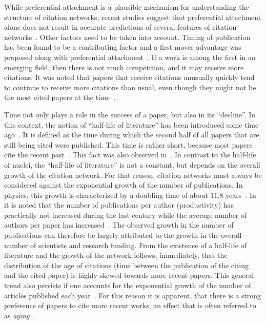 \documentclass[fleqn,10pt]{wlscirep}
\begin{document}
While preferential attachment is a plausible mechanism for understanding the structure of citation networks, recent studies suggest that preferential attachment alone does not result in accurate predictions of several features of citation networks~\cite{Borner2004, Lehmann2005}. Other factors need to be taken into account. Timing of publication has been found to be a contributing factor and a first-mover advantage was proposed along with preferential attachment~\cite{Newman2009x}. If a work is among the first in an emerging field, then there is not much competition, and it may receive more citations. It was noted that papers that receive citations unusually quickly tend to continue to receive more citations than usual, even though they might not be the most cited papers at the time~\cite{Newman_2014x}. 

Time not only plays a role in the success of a paper, but also in its ``decline''. In this context, the notion of ``half-life of literature'' has been introduced some time ago~\cite{Burton1960}. It is defined as the time during which the second half of all papers that are still being cited were published. This time is rather short, because most papers cite the recent past~\cite{Burton1960}. This fact was also observed in~\cite{deSollaPrice1965, Redner2005}. In contrast to the  half-life of nuclei, the ``half-life of literature'' is not a constant, but depends on the overall growth of the citation network. For that reason, citation networks must always be considered against the exponential growth of the number of publications. In physics, this growth is characterized by a doubling time of about 11.8 years~\cite{Martin2013}. In ~\cite{Martin2013, Fanelli2016} it is noted that the number of publications per author (productivity) has practically not increased during the last century while the average number of authors per paper has increased~\cite{Martin2013}. The observed growth in the number of publications can therefore be largely attributed to the growth in the overall number of scientists and research funding. From the existence of a half-life of literature and the growth of the network follows, immediately, that the distribution of the age of citations (time between the publication of the citing and the cited paper) is highly skewed towards more recent papers. %
This general trend also persists if one accounts for the exponential growth of the number of articles published each year~\cite{Redner2005}. For this reason it is apparent, that there is a strong preference of papers to cite more recent works, an effect that is often referred to as \textit{aging}~\cite{Wang2013x, Yin2017}.
\end{document}
